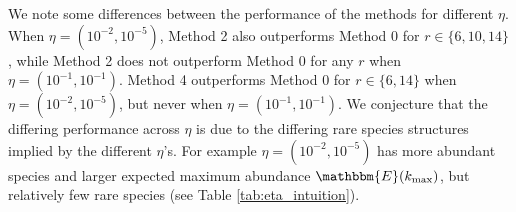 \documentclass[12pt]{article}
\theoremstyle{break}
\theoremstyle{break}
\begin{document}
We note some differences between the performance of the methods for different $\eta.$ When $\eta = (10^{-2},10^{-5})$, Method 2 also outperforms Method 0 for $r \in \{6, 10, 14\}$, while Method 2 does not outperform Method 0 for any $r$ when $\eta = (10^{-1},10^{-1})$.  Method 4 outperforms Method 0 for $r \in \{6, 14\}$ when $\eta = (10^{-2},10^{-5})$, but never when $\eta = (10^{-1},10^{-1})$.
We conjecture that the differing performance across $\eta$ is due to the differing rare species structures implied by the different $\eta$'s. For example $\eta = (10^{-2},10^{-5})$ has more abundant species and larger expected maximum abundance $\mathbbm{E}(k_{\text{max}})$, but relatively few rare species (see Table \ref{tab:eta_intuition}).


\end{document}

